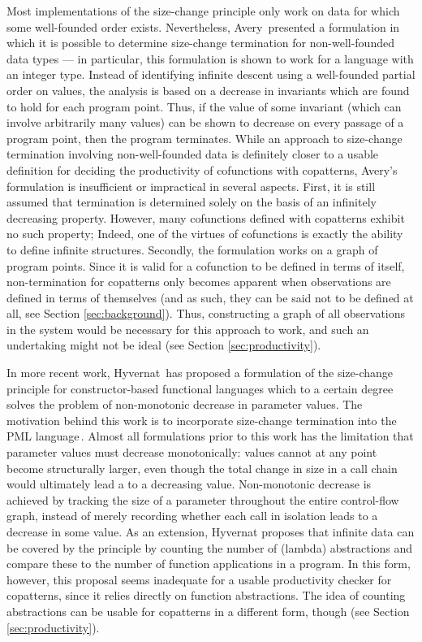 Most implementations of the size-change principle only work on data for which some well-founded order exists. Nevertheless, Avery\,\citep{Avery06} presented a formulation in which it is possible to determine size-change termination for non-well-founded data types --- in particular, this formulation is shown to work for a language with an integer type. Instead of identifying infinite descent using a well-founded partial order on values, the analysis is based on a decrease in invariants which are found to hold for each program point. Thus, if the value of some invariant (which can involve arbitrarily many values) can be shown to decrease on every passage of a program point, then the program terminates. While an approach to size-change termination involving non-well-founded data is definitely closer to a usable definition for deciding the productivity of cofunctions with copatterns, Avery's formulation is insufficient or impractical in several aspects. First, it is still assumed that termination is determined solely on the basis of an infinitely decreasing property. However, many cofunctions defined with copatterns exhibit no such property; Indeed, one of the virtues of cofunctions is exactly the ability to define infinite structures. Secondly, the formulation works on a graph of program points. Since it is valid for a cofunction to be defined in terms of itself, non-termination for copatterns only becomes apparent when observations are defined in terms of themselves (and as such, they can be said not to be defined at all, see Section \ref{sec:background}). Thus, constructing a graph of all observations in the system would be necessary for this approach to work, and such an undertaking might not be ideal (see Section \ref{sec:productivity}).

In more recent work, Hyvernat\,\citep{Hyvernat13} has proposed a formulation of the size-change principle for constructor-based functional languages which to a certain degree solves the problem of non-monotonic decrease in parameter values. The motivation behind this work is to incorporate size-change termination into the PML language\,\cite{PMLLanguage}. Almost all formulations prior to this work has the limitation that parameter values must decrease monotonically: values cannot at any point become structurally larger, even though the total change in size in a call chain would ultimately lead a to a decreasing value. Non-monotonic decrease is achieved by tracking the size of a parameter throughout the entire control-flow graph, instead of merely recording whether each call in isolation leads to a decrease in some value. As an extension, Hyvernat proposes that infinite data can be covered by the principle by counting the number of (lambda) abstractions and compare these to the number of function applications in a program. In this form, however, this proposal seems inadequate for a usable productivity checker for copatterns, since it relies directly on function abstractions. The idea of counting abstractions can be usable for copatterns in a different form, though (see Section \ref{sec:productivity}).

